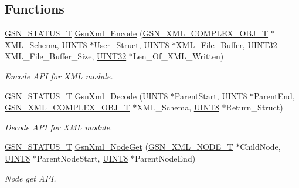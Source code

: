 \subsection*{Functions}
\begin{DoxyCompactItemize}
\item 
\hyperlink{a00659_gae36517c0f5872426a7034c9551eb96ac}{GSN\_\-STATUS\_\-T} \hyperlink{a00679_ga63f420980b051030cf42aba37139d27c}{GsnXml\_\-Encode} (\hyperlink{a00430}{GSN\_\-XML\_\-COMPLEX\_\-OBJ\_\-T} $\ast$XML\_\-Schema, \hyperlink{a00660_gab27e9918b538ce9d8ca692479b375b6a}{UINT8} $\ast$User\_\-Struct, \hyperlink{a00660_gab27e9918b538ce9d8ca692479b375b6a}{UINT8} $\ast$XML\_\-File\_\-Buffer, \hyperlink{a00660_gae1e6edbbc26d6fbc71a90190d0266018}{UINT32} XML\_\-File\_\-Buffer\_\-Size, \hyperlink{a00660_gae1e6edbbc26d6fbc71a90190d0266018}{UINT32} $\ast$Len\_\-Of\_\-XML\_\-Written)
\begin{DoxyCompactList}\small\item\em Encode API for XML module. \end{DoxyCompactList}\item 
\hyperlink{a00659_gae36517c0f5872426a7034c9551eb96ac}{GSN\_\-STATUS\_\-T} \hyperlink{a00679_ga47406fd5baaf0dff016d539afa016b0c}{GsnXml\_\-Decode} (\hyperlink{a00660_gab27e9918b538ce9d8ca692479b375b6a}{UINT8} $\ast$ParentStart, \hyperlink{a00660_gab27e9918b538ce9d8ca692479b375b6a}{UINT8} $\ast$ParentEnd, \hyperlink{a00430}{GSN\_\-XML\_\-COMPLEX\_\-OBJ\_\-T} $\ast$XML\_\-Schema, \hyperlink{a00660_gab27e9918b538ce9d8ca692479b375b6a}{UINT8} $\ast$Return\_\-Struct)
\begin{DoxyCompactList}\small\item\em Decode API for XML module. \end{DoxyCompactList}\item 
\hyperlink{a00659_gae36517c0f5872426a7034c9551eb96ac}{GSN\_\-STATUS\_\-T} \hyperlink{a00679_ga8617ee56599bff50a73b55c1d04919a5}{GsnXml\_\-NodeGet} (\hyperlink{a00434}{GSN\_\-XML\_\-NODE\_\-T} $\ast$ChildNode, \hyperlink{a00660_gab27e9918b538ce9d8ca692479b375b6a}{UINT8} $\ast$ParentNodeStart, \hyperlink{a00660_gab27e9918b538ce9d8ca692479b375b6a}{UINT8} $\ast$ParentNodeEnd)
\begin{DoxyCompactList}\small\item\em Node get API. \end{DoxyCompactList}\end{DoxyCompactItemize}



